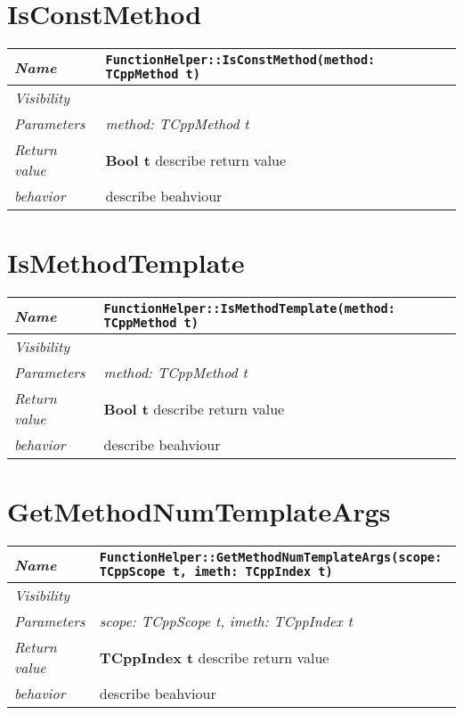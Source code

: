  \section{IsConstMethod}
\begin{longtable}{p{3cm} @{\hskip 1cm} p{12cm}}
 \hline
\textit{Name} & \texttt{FunctionHelper::IsConstMethod(method: TCppMethod t)}\\
\hline
 \textit{Visibility} & \\
\hline
\textit{Parameters} & \textit{method: TCppMethod t}\\
\hline
\textit{Return value} & \textbf{ Bool t} describe return value\\
  \hline
 \textit{behavior} & describe beahviour \\
\hline
\end{longtable} \pagebreak
 \section{IsMethodTemplate}
\begin{longtable}{p{3cm} @{\hskip 1cm} p{12cm}}
 \hline
\textit{Name} & \texttt{FunctionHelper::IsMethodTemplate(method: TCppMethod t)}\\
\hline
 \textit{Visibility} & \\
\hline
\textit{Parameters} & \textit{method: TCppMethod t}\\
\hline
\textit{Return value} & \textbf{ Bool t} describe return value\\
  \hline
 \textit{behavior} & describe beahviour \\
\hline
\end{longtable} \pagebreak
 \section{GetMethodNumTemplateArgs}
\begin{longtable}{p{3cm} @{\hskip 1cm} p{12cm}}
 \hline
\textit{Name} & \texttt{FunctionHelper::GetMethodNumTemplateArgs(scope: TCppScope t, imeth: TCppIndex t)}\\
\hline
 \textit{Visibility} & \\
\hline
\textit{Parameters} & \textit{scope: TCppScope t, imeth: TCppIndex t}\\
\hline
\textit{Return value} & \textbf{ TCppIndex t} describe return value\\
  \hline
 \textit{behavior} & describe beahviour \\
\hline
\end{longtable} \pagebreak
